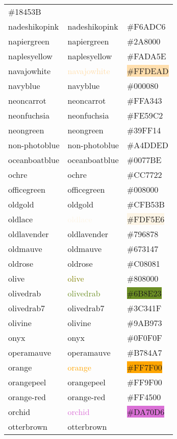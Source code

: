 \documentclass[
]{article}
\begin{document}
\begin{longtable}[]{@{}lll@{}}
\colorbox{msugreen}{\#18453B}\tabularnewline
nadeshikopink & \textcolor{nadeshikopink}{nadeshikopink} &
\colorbox{nadeshikopink}{\#F6ADC6}\tabularnewline
napiergreen & \textcolor{napiergreen}{napiergreen} &
\colorbox{napiergreen}{\#2A8000}\tabularnewline
naplesyellow & \textcolor{naplesyellow}{naplesyellow} &
\colorbox{jonquil}{\#FADA5E}\tabularnewline
navajowhite & \textcolor{navajowhite}{navajowhite} &
\colorbox{navajowhite}{\#FFDEAD}\tabularnewline
navyblue & \textcolor{navyblue}{navyblue} &
\colorbox{navyblue}{\#000080}\tabularnewline
neoncarrot & \textcolor{neoncarrot}{neoncarrot} &
\colorbox{neoncarrot}{\#FFA343}\tabularnewline
neonfuchsia & \textcolor{neonfuchsia}{neonfuchsia} &
\colorbox{neonfuchsia}{\#FE59C2}\tabularnewline
neongreen & \textcolor{neongreen}{neongreen} &
\colorbox{neongreen}{\#39FF14}\tabularnewline
non-photoblue & \textcolor{non-photoblue}{non-photoblue} &
\colorbox{non-photoblue}{\#A4DDED}\tabularnewline
oceanboatblue & \textcolor{oceanboatblue}{oceanboatblue} &
\colorbox{oceanboatblue}{\#0077BE}\tabularnewline
ochre & \textcolor{ochre}{ochre} &
\colorbox{ochre}{\#CC7722}\tabularnewline
officegreen & \textcolor{officegreen}{officegreen} &
\colorbox{officegreen}{\#008000}\tabularnewline
oldgold & \textcolor{oldgold}{oldgold} &
\colorbox{oldgold}{\#CFB53B}\tabularnewline
oldlace & \textcolor{oldlace}{oldlace} &
\colorbox{oldlace}{\#FDF5E6}\tabularnewline
oldlavender & \textcolor{oldlavender}{oldlavender} &
\colorbox{oldlavender}{\#796878}\tabularnewline
oldmauve & \textcolor{oldmauve}{oldmauve} &
\colorbox{oldmauve}{\#673147}\tabularnewline
oldrose & \textcolor{oldrose}{oldrose} &
\colorbox{oldrose}{\#C08081}\tabularnewline
olive & \textcolor{olive}{olive} &
\colorbox{heartgold}{\#808000}\tabularnewline
olivedrab & \textcolor{olivedrab}{olivedrab} &
\colorbox{olivedrab}{\#6B8E23}\tabularnewline
olivedrab7 & \textcolor{olivedrab7}{olivedrab7} &
\colorbox{olivedrab7}{\#3C341F}\tabularnewline
olivine & \textcolor{olivine}{olivine} &
\colorbox{olivine}{\#9AB973}\tabularnewline
onyx & \textcolor{onyx}{onyx} & \colorbox{onyx}{\#0F0F0F}\tabularnewline
operamauve & \textcolor{operamauve}{operamauve} &
\colorbox{operamauve}{\#B784A7}\tabularnewline
orange & \textcolor{orange}{orange} &
\colorbox{orange}{\#FF7F00}\tabularnewline
orangepeel & \textcolor{orangepeel}{orangepeel} &
\colorbox{orangepeel}{\#FF9F00}\tabularnewline
orange-red & \textcolor{orange-red}{orange-red} &
\colorbox{orange-red}{\#FF4500}\tabularnewline
orchid & \textcolor{orchid}{orchid} &
\colorbox{orchid}{\#DA70D6}\tabularnewline
otterbrown & \textcolor{otterbrown}{otterbrown} &

\end{longtable}
\end{document}
